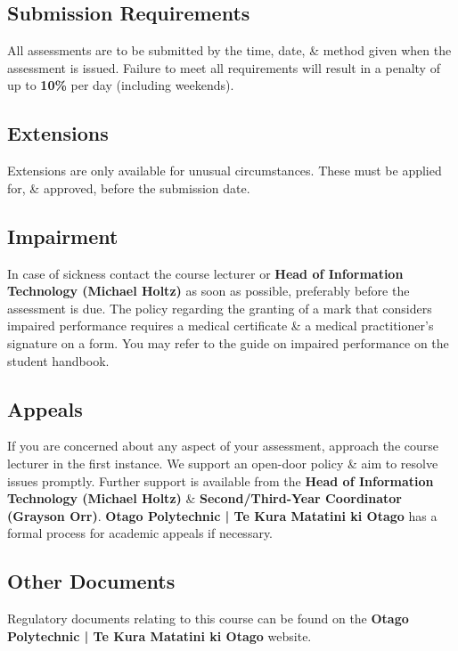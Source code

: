 \documentclass{article}
\begin{document}
\subsection*{Submission Requirements}
All assessments are to be submitted by the time, date, \& method given when the assessment is issued. Failure to meet all requirements will result in a penalty of up to \textbf{10\%} per day (including weekends).

\subsection*{Extensions}
Extensions are only available for unusual circumstances. These must be applied for, \& approved, before the submission date.

\subsection*{Impairment}
In case of sickness contact the course lecturer or \textbf{Head of Information Technology (Michael Holtz)} as soon as possible, preferably before the assessment is due. The policy regarding the granting of a mark that considers impaired performance requires a medical certificate \& a medical practitioner’s signature on a form. You may refer to the guide on impaired performance on the student handbook.

\subsection*{Appeals}
If you are concerned about any aspect of your assessment, approach the course lecturer in the first instance. We support an open-door policy \& aim to resolve issues promptly. Further support is available from the \textbf{Head of Information Technology (Michael Holtz)} \& \textbf{Second/Third-Year Coordinator (Grayson Orr)}. \textbf{Otago Polytechnic | Te Kura Matatini ki Otago} has a formal process for academic appeals if necessary.

\subsection*{Other Documents}
Regulatory documents relating to this course can be found on the \textbf{Otago Polytechnic | Te Kura Matatini ki Otago} website.
\end{document}
